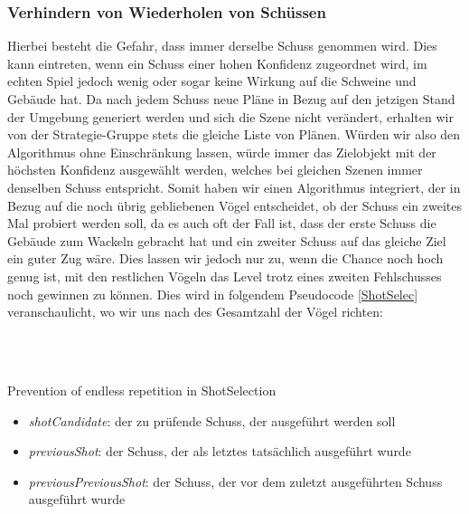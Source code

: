 \subsubsection{Verhindern von Wiederholen von Schüssen}
Hierbei besteht die Gefahr, dass immer derselbe Schuss genommen wird. Dies kann eintreten, wenn ein Schuss einer hohen Konfidenz zugeordnet wird, im echten Spiel jedoch wenig oder sogar keine Wirkung auf die Schweine und Gebäude hat. Da nach jedem Schuss neue Pläne in Bezug auf den jetzigen Stand der Umgebung generiert werden und sich die Szene nicht verändert, erhalten wir von der Strategie-Gruppe stets die gleiche Liste von Plänen. Würden wir also den Algorithmus ohne Einschränkung lassen, würde immer das Zielobjekt mit der höchsten Konfidenz ausgewählt werden, welches bei gleichen Szenen immer denselben Schuss entspricht. 
Somit haben wir einen Algorithmus integriert, der in Bezug auf die noch übrig gebliebenen Vögel entscheidet, ob der Schuss ein zweites Mal probiert werden soll, da es auch oft der Fall ist, dass der erste Schuss die Gebäude zum Wackeln gebracht hat und ein zweiter Schuss auf das gleiche Ziel ein guter Zug wäre. Dies lassen wir jedoch nur zu, wenn die Chance noch hoch genug ist, mit den restlichen Vögeln das Level trotz eines zweiten Fehlschusses noch gewinnen zu können. Dies wird in folgendem Pseudocode \ref{ShotSelec} veranschaulicht, wo wir uns nach des Gesamtzahl der Vögel richten: \\
\begin{algorithm}[H]
  \begin{algorithmic}[1]
  	\\ \hspace{2.5em} 
  	\Else \\
  		\hspace{2.5em} 
  	\EndIf
  \EndIf
  \end{algorithmic}
  \caption{Prevention of endless repetition in ShotSelection \label{ShotSelec}}
\end{algorithm}

\begin{table}[H]
\begin{itemize}
\item \textit{shotCandidate}: der zu prüfende Schuss, der ausgeführt werden soll 
\item \textit{previousShot}: der Schuss, der als letztes tatsächlich ausgeführt wurde
\item \textit{previousPreviousShot}: der Schuss, der vor dem zuletzt ausgeführten Schuss ausgeführt wurde
\end{itemize}
\end{table}

